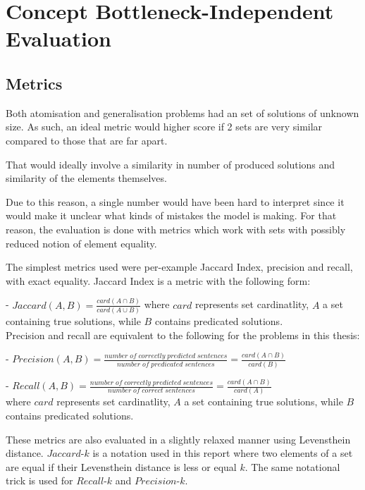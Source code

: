 \section{Concept Bottleneck-Independent Evaluation}

\subsection{Metrics}

Both atomisation and generalisation problems had an set of solutions of unknown size.
As such, an ideal metric would higher score if 2 sets are very similar compared to those that are far apart.

That would ideally involve a similarity in number of produced solutions and similarity of the elements themselves.

Due to this reason, a single number would have been hard to interpret since it would make it unclear what kinds of mistakes the model is making. 
For that reason, the evaluation is done with metrics which work with sets with possibly reduced notion of element equality.

The simplest metrics used were per-example Jaccard Index, precision and recall, with exact equality.
Jaccard Index is a metric with the following form:

 - $Jaccard(A, B) = \frac{card(A \cap B)}{card(A \cup B)}$ where $card$ represents set cardinatlity, $A$ a set containing true solutions, while $B$ contains predicated solutions.\\
 
Precision and recall are equivalent to the following for the problems in this thesis:
 
  - $Precision(A, B) = \frac{number \; of \; correctly \; predicted \; sentences}{number \; of \; predicated \; sentences} = \frac{card(A \cap B)}{card(B)}$
  
  - $Recall(A, B) = \frac{number \; of \; correctly \; predicted \; sentences}{number \; of \; correct \; sentences} = \frac{card(A \cap B)}{card(A)}$ \\
where  $card$ represents set cardinatlity, $A$ a set containing true solutions, while $B$ contains predicated solutions.

These metrics are also evaluated in a slightly relaxed manner using Levensthein distance.
$Jaccard\text{-}k$ is a notation used in this report where two elements of a set are equal if their Levensthein distance is less or equal $k$.
The same notational trick is used for $Recall\text{-}k$ and $Precision\text{-}k$.

